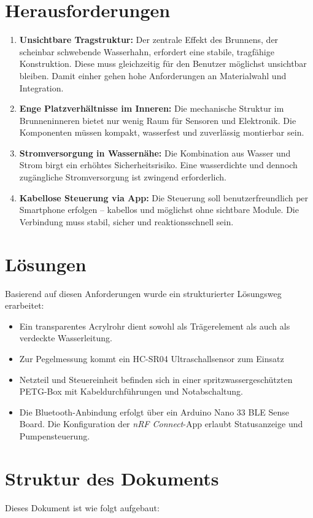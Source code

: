 \section{Herausforderungen}
\begin{enumerate}
	\item \textbf{Unsichtbare Tragstruktur: }Der zentrale Effekt des Brunnens, der scheinbar schwebende Wasserhahn, erfordert eine stabile, tragfähige Konstruktion. Diese muss gleichzeitig für den Benutzer möglichst unsichtbar bleiben. Damit einher gehen hohe Anforderungen an Materialwahl und Integration.
	\item \textbf{Enge Platzverhältnisse im Inneren: }Die mechanische Struktur im Brunneninneren bietet nur wenig Raum für Sensoren und Elektronik. Die Komponenten müssen kompakt, wasserfest und zuverlässig montierbar sein.
	\item \textbf{Stromversorgung in Wassernähe: }Die Kombination aus Wasser und Strom birgt ein erhöhtes Sicherheitsrisiko. Eine wasserdichte und dennoch zugängliche Stromversorgung ist zwingend erforderlich.
	\item \textbf{Kabellose Steuerung via App: }Die Steuerung soll benutzerfreundlich per Smartphone erfolgen – kabellos und möglichst ohne sichtbare Module. Die Verbindung muss stabil, sicher und reaktionsschnell sein.
\end{enumerate}

\section{Lösungen}
Basierend auf diesen Anforderungen wurde ein strukturierter Lösungsweg erarbeitet:
\begin{itemize}
	\item Ein transparentes Acrylrohr dient sowohl als Trägerelement als auch als verdeckte Wasserleitung.
	\item Zur Pegelmessung kommt ein HC-SR04 Ultraschallsensor zum Einsatz
	\item Netzteil und Steuereinheit befinden sich in einer spritzwassergeschützten PETG-Box mit Kabeldurchführungen und Notabschaltung.
	\item Die Bluetooth-Anbindung erfolgt über ein Arduino Nano 33 BLE Sense Board. Die Konfiguration der \textit{nRF Connect}-App erlaubt Statusanzeige und Pumpensteuerung.
\end{itemize}


\section{Struktur des Dokuments}
Dieses Dokument ist wie folgt aufgebaut:


